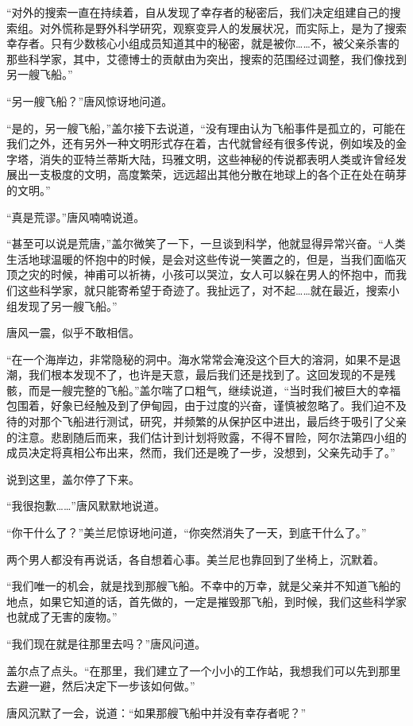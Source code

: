 “对外的搜索一直在持续着，自从发现了幸存者的秘密后，我们决定组建自己的搜索组。对外慌称是野外科学研究，观察变异人的发展状况，而实际上，是为了搜索幸存者。只有少数核心小组成员知道其中的秘密，就是被你……不，被父亲杀害的那些科学家，其中，艾德博士的贡献由为突出，搜索的范围经过调整，我们像找到另一艘飞船。”

“另一艘飞船？”唐风惊讶地问道。

“是的，另一艘飞船，”盖尔接下去说道，“没有理由认为飞船事件是孤立的，可能在我们之外，还有另外一种文明形式存在着，古代就曾经有很多传说，例如埃及的金字塔，消失的亚特兰蒂斯大陆，玛雅文明，这些神秘的传说都表明人类或许曾经发展出一支极度的文明，高度繁荣，远远超出其他分散在地球上的各个正在处在萌芽的文明。”

“真是荒谬。”唐风喃喃说道。

“甚至可以说是荒唐，”盖尔微笑了一下，一旦谈到科学，他就显得异常兴奋。“人类生活地球温暖的怀抱中的时候，是会对这些传说一笑置之的，但是，当我们面临灭顶之灾的时候，神甫可以祈祷，小孩可以哭泣，女人可以躲在男人的怀抱中，而我们这些科学家，就只能寄希望于奇迹了。我扯远了，对不起……就在最近，搜索小组发现了另一艘飞船。”

唐风一震，似乎不敢相信。

“在一个海岸边，非常隐秘的洞中。海水常常会淹没这个巨大的溶洞，如果不是退潮，我们根本发现不了，也许是天意，最后我们还是找到了。这回发现的不是残骸，而是一艘完整的飞船。”盖尔喘了口粗气，继续说道，“当时我们被巨大的幸福包围着，好象已经触及到了伊甸园，由于过度的兴奋，谨慎被忽略了。我们迫不及待的对那个飞船进行测试，研究，并频繁的从保护区中进出，最后终于吸引了父亲的注意。悲剧随后而来，我们估计到计划将败露，不得不冒险，阿尔法第四小组的成员决定将真相公布出来，然而，我们还是晚了一步，没想到，父亲先动手了。”

说到这里，盖尔停了下来。

“我很抱歉……”唐风默默地说道。

“你干什么了？”美兰尼惊讶地问道，“你突然消失了一天，到底干什么了。”

两个男人都没有再说话，各自想着心事。美兰尼也靠回到了坐椅上，沉默着。

“我们唯一的机会，就是找到那艘飞船。不幸中的万幸，就是父亲并不知道飞船的地点，如果它知道的话，首先做的，一定是摧毁那飞船，到时候，我们这些科学家也就成了无害的废物。”

“我们现在就是往那里去吗？”唐风问道。

盖尔点了点头。“在那里，我们建立了一个小小的工作站，我想我们可以先到那里去避一避，然后决定下一步该如何做。”

唐风沉默了一会，说道：“如果那艘飞船中并没有幸存者呢？”

